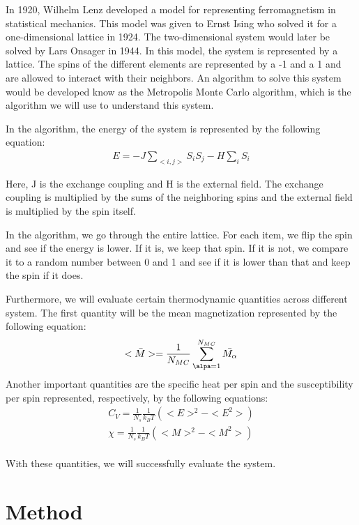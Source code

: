 \documentclass[pra,twocolumn,showpacs,amsmath,amssymb]{revtex4-2}
\begin{document}
In 1920, Wilhelm Lenz developed a model for representing ferromagnetism in statistical mechanics. This model was given to Ernst Ising who solved it for a one-dimensional lattice in 1924. The two-dimensional system would later be solved by Lars Onsager in 1944. In this model, the system is represented by a lattice. The spins of the different elements are represented by a -1 and a 1 and are allowed to interact with their neighbors. An algorithm to solve this system would be developed know as the Metropolis Monte Carlo algorithm, which is the algorithm we will use to understand this system.
\par In the algorithm, the energy of the system is represented by the following equation:
\begin{eqnarray}
E = -J\sum_{<i,j>}S_i S_j - H\sum_i S_i
\end{eqnarray}
\par Here, J is the exchange coupling and H is the external field. The exchange coupling is multiplied by the sums of the neighboring spins and the external field is multiplied by the spin itself.
\par In the algorithm, we go through the entire lattice. For each item, we flip the spin and see if the energy is lower. If it is, we keep that spin. If it is not, we compare it to a random number between 0 and 1 and see if it is lower than that and keep the spin if it does.
\par Furthermore, we will evaluate certain thermodynamic quantities across different system. The first quantity will be the mean magnetization represented by the following equation:
\begin{eqnarray}
<\bar{M}> = \frac{1}{N_{MC}}\sum_{\alpa=1}^{N_{MC}}\bar{M_\alpha}
\end{eqnarray}
Another important quantities are the specific heat per spin and the susceptibility per spin represented, respectively, by the following equations:
\begin{eqnarray}
C_V = \frac{1}{N_{s}}\frac{1}{k_B T} (<E>^2 - <E^2>) \\
\chi = \frac{1}{N_{s}}\frac{1}{k_B T} (<M>^2 - <M^2>) \\
\end{eqnarray}
\par With these quantities, we will successfully evaluate the system.

\section{Method} \label{sec:method}
\end{document}
